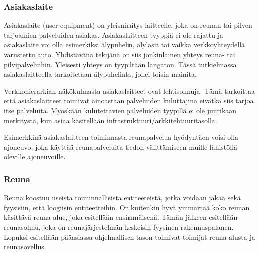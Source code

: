 

\subsubsection{Asiakaslaite}
Asiakaslaite (user equipment) on yleisnimitys laitteelle, joka on reunan tai pilven tarjoamien palveluiden asiakas. 
Asiakaslaitteen tyyppiä ei ole rajattu ja asiakaslaite voi olla esimerkiksi älypuhelin, älylasit tai vaikka verkkoyhteydellä varustettu auto. 
Yhdistävänä tekijänä on siis jonkinlainen yhteys reuna- tai pilvipalveluihin. Yleisesti yhteys on tyypiltään langaton. 
Tässä tutkielmassa asiakaslaitteella tarkoitetaan älypuhelinta, jollei toisin mainita.

Verkkohierarkian näkökulmasta asiakaslaitteet ovat lehtisolmuja. Tämä tarkoittaa että asiakaslaitteet toimivat ainoastaan palveluiden kuluttajina eivätkä siis tarjoa itse palveluita. Myöskään kulutettavien palveluiden tyypillä ei ole juurikaan merkitystä, kun asiaa käsitellään infrastruktuuri/arkkitehtuuritasolla.

Esimerkkinä asiakaslaitteen toiminnasta reunapalvelua hyödyntäen voisi olla ajoneuvo, joka käyttää reunapalveluita tiedon välittämiseen muille lähistöllä oleville ajoneuvoille.




\subsubsection{Reuna} \label{reunatoimijat}
Reuna koostuu useista toiminnallisista entiteeteistä, jotka voidaan jakaa sekä fyysisiin, että loogiisin entiteetteihin. On kuitenkin hyvä ymmärtää koko reunan käsittävä reuna-alue, joka esitellään ensimmäisenä. Tämän jälkeen esitellään reunasolmu, joka on reunajärjestelmän keskeisin fyysinen rakennuspalanen. Lopuksi esitellään pääasiassa ohjelmallisen tason toimivat toimijat reuna-alusta ja reunasovellus.

